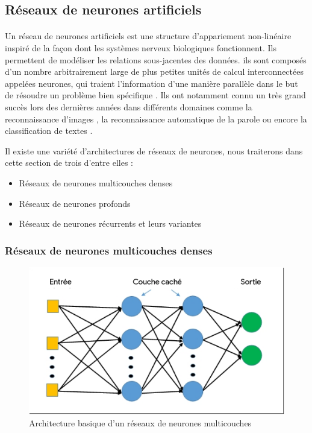 	\subsection{Réseaux de neurones artificiels}
		\paragraph{}
		Un réseau de neurones artificiels est une structure d'appariement non-linéaire inspiré de la façon dont les systèmes nerveux biologiques fonctionnent. Ils permettent de modéliser les relations sous-jacentes des données. ils sont composés d'un nombre arbitrairement large de plus petites unités de calcul interconnectées appelées neurones, qui traient l'information d'une manière parallèle dans le but de résoudre un problème bien spécifique \cite{neural_nets}. Ils ont notamment connu un très grand succès lors des dernières années dans différents domaines comme la reconnaissance d'images \cite{inception}, la reconnaissance automatique de la parole \cite{speech_reco_dnn,speech_reco_Yu2015} ou encore la classification de textes \cite{seq2seq_multitask_classification,dnn_text_classification}.
		\par 
		Il existe une variété d'architectures de réseaux de neurones, nous traiterons dans cette section de trois d'entre elles : 
			\begin{itemize}
				\item Réseaux de neurones multicouches denses
				\item Réseaux de neurones profonds
				\item Réseaux de neurones récurrents et leurs variantes
			\end{itemize}
		\subsubsection{Réseaux de neurones multicouches denses}
		\begin{figure}[H]
			\centering
			\includegraphics[width=0.5\linewidth]{images/notions/mlp.png}
			\caption{Architecture basique d'un réseaux de neurones multicouches}
			\label{mlp}
		\end{figure}
